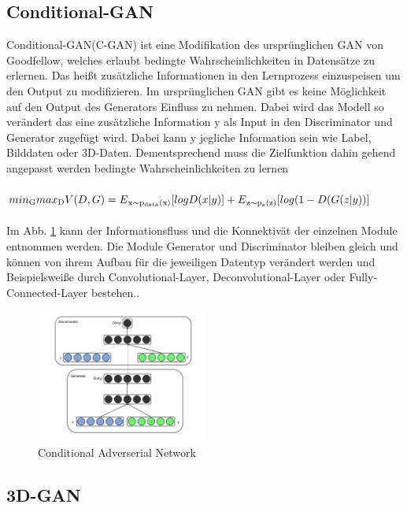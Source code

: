\documentclass{llncs}
\begin{document}
\subsection{Conditional-GAN}

Conditional-GAN(C-GAN) ist eine Modifikation des ursprünglichen GAN von Goodfellow, welches erlaubt bedingte Wahrscheinlichkeiten in Datensätze zu erlernen. Das heißt zusätzliche Informationen in den Lernprozess einzuspeisen um den Output zu modifizieren. Im ursprünglichen GAN gibt es keine Möglichkeit auf den Output des Generators Einfluss zu nehmen. Dabei wird das Modell so verändert das eine zusätzliche Information y als Input in den Discriminator und Generator zugefügt wird. Dabei kann y jegliche Information sein wie Label, Bilddaten oder 3D-Daten. Dementsprechend muss die Zielfunktion dahin gehend angepasst werden bedingte Wahrscheinlichkeiten zu lernen
\\\\
\begin{math}
min\textsubscript{G} max\textsubscript{D}V(D,G)=E\textsubscript{x$\sim$p\textsubscript{data}(x)}[logD(x|y)]  + E\textsubscript{z$\sim$p\textsubscript{z}(z)}[log(1-D(G(z|y))]          
\end{math}
\\\\
Im Abb. \ref{fig:Bild38} kann der Informationsfluss und die Konnektivät der einzelnen Module entnommen werden. Die Module Generator und Discriminator bleiben gleich und können von ihrem Aufbau für die jeweiligen Datentyp verändert werden und Beispielsweiße durch Convolutional-Layer, Deconvolutional-Layer oder Fully-Connected-Layer bestehen.\cite{dcgan}.

\begin{figure}[htbp] 
	\centering
	\includegraphics[width=0.5\textwidth]{cgan.png}
	\caption{Conditional Adverserial Network}
	\label{fig:Bild38}
\end{figure}

\subsection{3D-GAN}\label{sec:3dgan}
\end{document}
